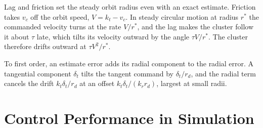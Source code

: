 \documentclass[lettersize,journal]{IEEEtran}
\newcommand{\rev}[1]{#1}                             %
\providecommand{\DIFaddbegin}{\protect\color{DIFaddtx}} %
\providecommand{\DIFaddend}{\protect\color{black}} %
\providecommand{\DIFaddincludegraphics}[2][]{{\color{DIFaddtx}\setlength{\fboxrule}{1.5pt}\fbox{\DIFOincludegraphics[#1]{#2}}}} %
\DeclareRobustCommand{\DIFaddbegin}{\DIFOaddbegin \let\includegraphics\DIFaddincludegraphics} %
\DeclareRobustCommand{\DIFaddend}{\DIFOaddend \let\includegraphics\DIFOincludegraphics} %
\begin{document}
Lag and friction set the steady orbit radius even with an exact estimate. Friction takes $v_c$ off the orbit speed, $V = k_t - v_c$. In steady circular motion at radius $r^*$ the commanded velocity turns at the rate $V/r^*$, and the lag makes the cluster follow it about $\tau$ late, which tilts its velocity outward by the angle $\tau V/r^*$. The cluster therefore drifts outward at $\tau V^2/r^*$.

To first order, an estimate error adds its radial component to the radial error. A tangential component $\delta_t$ tilts the tangent command by $\delta_t/r_d$, and the radial term cancels the drift $k_t\delta_t/r_d$ at an offset $k_t\delta_t/(k_r r_d)$, largest at small radii.


\section{Control Performance in Simulation}
\DIFaddbegin \providecommand{\newnum}[1]{\textcolor{blue}{#1}}
\DIFaddend 
\end{document}
